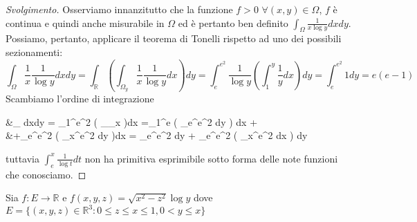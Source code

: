 \begin{proof}[Svolgimento]
	Osserviamo innanzitutto che la funzione $f > 0 \, \, \forall (x, y) \in \Omega$, $f$ è continua e quindi anche misurabile in $\Omega$ ed è pertanto ben definito $\int_\Omega \frac{1}{x\log{y}}dxdy$. Possiamo, pertanto, applicare il teorema di Tonelli rispetto ad uno dei possibili sezionamenti:
	$$
	\int_\Omega \frac{1}{x} \frac{1}{\log{y}}dxdy = \int_\mathbb{R} \left( \int_{\Omega_y} \frac{1}{x}\frac{1}{\log{y}} dx \right)dy = \int_e^{e^2} \frac{1}{\log{y}} \left( \int_1^y \frac{1}{y} dx \right) dy = \int_e^{e^2} 1dy = e(e-1)
	$$
	Scambiamo l'ordine di integrazione
	\begin{flalign*}
	&\int_\Omega {} dxdy = \int_1^{e^2}  \left( \int_{\Omega_x}  \right)dx =\int_1^e  \left( \int_e^{e^2} dy \right) dx + \\
	&+\int_e^{e^2}  \left( \int_x^{e^2} dy \right)dx = \int_e^{e^2} dy + \int_e^{e^2} \left( \int_x^{e^2} dx \right) dy
	\end{flalign*}
	tuttavia $\int_e^x \frac{1}{\log{t}}dt$ non ha primitiva esprimibile sotto forma delle note funzioni che conosciamo. 
\end{proof}
\begin{exercise}
	Sia $f: E \to \mathbb{R}$ e $f(x, y, z) = \sqrt{x^2 - z^2}\log{y}$ dove $E = \{(x, y, z) \in \mathbb{R}^3 : 0 \leq z \leq x \leq 1, 0 < y \leq x \}$
\end{exercise}
